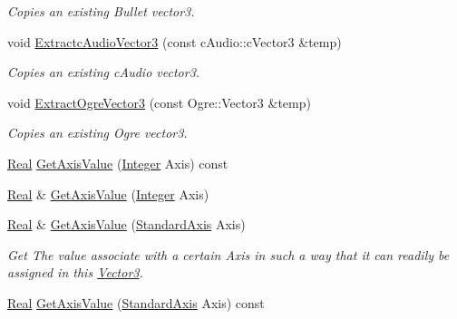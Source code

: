 \begin{DoxyCompactItemize}
\begin{DoxyCompactList}\small\item\em Copies an existing Bullet vector3. \item\end{DoxyCompactList}\item 
void \hyperlink{classMezzanine_1_1Vector3_a067981af0fe3fca1e3589de024473a61}{ExtractcAudioVector3} (const cAudio::cVector3 \&temp)
\begin{DoxyCompactList}\small\item\em Copies an existing cAudio vector3. \item\end{DoxyCompactList}\item 
void \hyperlink{classMezzanine_1_1Vector3_a8458214b99c59a30d9d8cc2d9efd19bd}{ExtractOgreVector3} (const Ogre::Vector3 \&temp)
\begin{DoxyCompactList}\small\item\em Copies an existing Ogre vector3. \item\end{DoxyCompactList}\item 
\hyperlink{namespaceMezzanine_a726731b1a7df72bf3583e4a97282c6f6}{Real} \hyperlink{classMezzanine_1_1Vector3_a54db774dc4ee3cf620790c97b44f6d91}{GetAxisValue} (\hyperlink{namespaceMezzanine_ac3576e52af3c62d13dde94829e0c5465}{Integer} Axis) const 
\item 
\hyperlink{namespaceMezzanine_a726731b1a7df72bf3583e4a97282c6f6}{Real} \& \hyperlink{classMezzanine_1_1Vector3_ab23f2a5d206ad5fff3fe422e64e569c1}{GetAxisValue} (\hyperlink{namespaceMezzanine_ac3576e52af3c62d13dde94829e0c5465}{Integer} Axis)
\item 
\hyperlink{namespaceMezzanine_a726731b1a7df72bf3583e4a97282c6f6}{Real} \& \hyperlink{classMezzanine_1_1Vector3_a83ad1f8b0d517214cafb96beacd4af5a}{GetAxisValue} (\hyperlink{namespaceMezzanine_ab41a00a8c6a47b576dc987ec34e16ba1}{StandardAxis} Axis)
\begin{DoxyCompactList}\small\item\em Get The value associate with a certain Axis in such a way that it can readily be assigned in this \hyperlink{classMezzanine_1_1Vector3}{Vector3}. \item\end{DoxyCompactList}\item 
\hyperlink{namespaceMezzanine_a726731b1a7df72bf3583e4a97282c6f6}{Real} \hyperlink{classMezzanine_1_1Vector3_a05edc8c1ba36c255eabe6a433b6618c4}{GetAxisValue} (\hyperlink{namespaceMezzanine_ab41a00a8c6a47b576dc987ec34e16ba1}{StandardAxis} Axis) const 

\end{DoxyCompactItemize}
